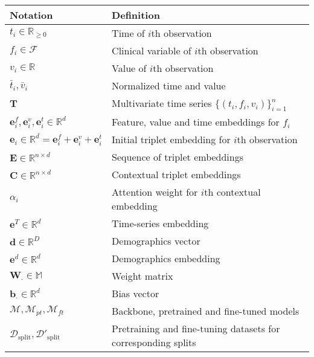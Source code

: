 \begin{tabular}{ll}
\toprule
\textbf{Notation} & \textbf{Definition} \\
\midrule
\(t_i \in \mathbb{R}_{\geq 0}\) & Time of \(i\)th observation \\
\(f_i \in \mathcal{F}\) & Clinical variable of \(i\)th observation \\
\(v_i \in \mathbb{R}\) & Value of \(i\)th observation \\
\(\bar{t}_i, \bar{v}_i\) & Normalized time and value \\
\(\mathbf{T}\) & Multivariate time series \(\{(t_i, f_i, v_i)\}_{i=1}^n\) \\
\(\mathbf{e}_i^f, \mathbf{e}_i^v, \mathbf{e}_i^t \in \mathbb{R}^d\) & Feature, value and time embeddings for \(f_i\) \\
\(\mathbf{e}_i \in \mathbb{R}^d = \mathbf{e}_i^f + \mathbf{e}_i^v + \mathbf{e}_i^t\) & Initial triplet embedding for \(i\)th observation \\
\(\mathbf{E} \in \mathbb{R}^{n \times d}\) & Sequence of triplet embeddings \\
\(\mathbf{C} \in \mathbb{R}^{n \times d}\) & Contextual triplet embeddings \\
\(\alpha_i\) & Attention weight for \(i\)th contextual embedding \\
\(\mathbf{e}^T \in \mathbb{R}^d\) & Time-series embedding \\
\(\mathbf{d} \in \mathbb{R}^D\) & Demographics vector \\
\(\mathbf{e}^d \in \mathbb{R}^d\) & Demographics embedding \\
\(\mathbf{W}_\cdot \in \mathbb{M}\) & Weight matrix \\
\(\mathbf{b}_\cdot \in \mathbb{R}^d\) & Bias vector \\
\(\mathcal{M}, \mathcal{M}_{pt}, \mathcal{M}_{ft}\) & Backbone, pretrained and fine-tuned models \\
\(\mathcal{D}_{\text{split}}, \mathcal{D}'_{\text{split}} \) & Pretraining and fine-tuning datasets for corresponding splits \\
\bottomrule
\end{tabular}
